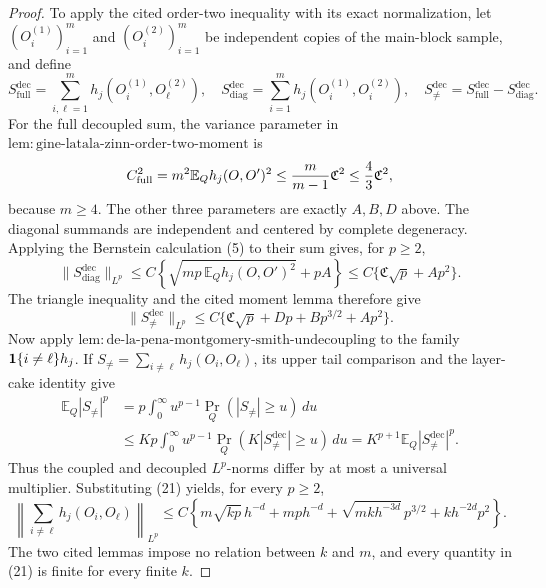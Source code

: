 \documentclass{article}
\begin{document}
\begin{proof}
To apply the cited order-two inequality with its exact normalization, let \((O_i^{(1)})_{i=1}^m\) and \((O_i^{(2)})_{i=1}^m\) be independent copies of the main-block sample, and define
\[
 S_{\mathrm{full}}^{\mathrm{dec}}
 =\sum_{i,\ell=1}^m h_j(O_i^{(1)},O_\ell^{(2)}),
 \quad
 S_{\mathrm{diag}}^{\mathrm{dec}}
 =\sum_{i=1}^m h_j(O_i^{(1)},O_i^{(2)}),
 \quad
 S_{\ne}^{\mathrm{dec}}
 =S_{\mathrm{full}}^{\mathrm{dec}}-S_{\mathrm{diag}}^{\mathrm{dec}}.
\]
For the full decoupled sum, the variance parameter in \(\mathrm{lem{:}gine\text{-}latala\text{-}zinn\text{-}order\text{-}two\text{-}moment}\) is
\[
 C_{\mathrm{full}}^2=m^2\mathbb E_Qh_j(O,O')^2
 \le {m\over m-1}\mathfrak C^2\le {4\over3}\mathfrak C^2,
\]
because \(m\ge4\).  The other three parameters are exactly \(A,B,D\) above.  The diagonal summands are independent and centered by complete degeneracy.  Applying the Bernstein calculation (5) to their sum gives, for \(p\ge2\),
\[
 \|S_{\mathrm{diag}}^{\mathrm{dec}}\|_{L^p}
 \le C\left\{\sqrt{mp\,\mathbb E_Qh_j(O,O')^2}+pA\right\}
 \le C\{\mathfrak C\sqrt p+Ap^2\}.
\]
The triangle inequality and the cited moment lemma therefore give
\[
 \|S_{\ne}^{\mathrm{dec}}\|_{L^p}
 \le C\{\mathfrak C\sqrt p+Dp+Bp^{3/2}+Ap^2\}.
\]
Now apply \(\mathrm{lem{:}de\text{-}la\text{-}pena\text{-}montgomery\text{-}smith\text{-}undecoupling}\) to the family \({\bf1}\{i\ne\ell\}h_j\).  If \(S_{\ne}=\sum_{i\ne\ell}h_j(O_i,O_\ell)\), its upper tail comparison and the layer-cake identity give
\[
 \begin{aligned}
 \mathbb E_Q|S_{\ne}|^p
 &=p\int_0^\infty u^{p-1}\Pr_Q(|S_{\ne}|\ge u)\,du\\
 &\le Kp\int_0^\infty u^{p-1}
       \Pr_Q(K|S_{\ne}^{\mathrm{dec}}|\ge u)\,du
 =K^{p+1}\mathbb E_Q|S_{\ne}^{\mathrm{dec}}|^p.
 \end{aligned}
\]
Thus the coupled and decoupled \(L^p\)-norms differ by at most a universal multiplier.  Substituting (21) yields, for every \(p\ge2\),
\[
 \left\|\sum_{i\ne\ell}h_j(O_i,O_\ell)\right\|_{L^p}
 \le C\left\{m\sqrt{kp}\,h^{-d}+mp h^{-d}
 +\sqrt{mk h^{-3d}}\,p^{3/2}+kh^{-2d}p^2\right\}.
\tag{22}
\]
The two cited lemmas impose no relation between \(k\) and \(m\), and every quantity in (21) is finite for every finite \(k\).


\end{proof}
\end{document}
